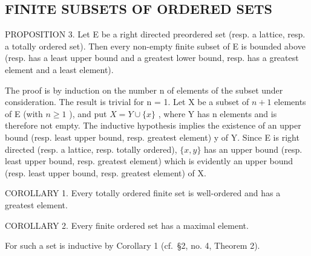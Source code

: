 \subsection{FINITE SUBSETS OF ORDERED SETS}

PROPOSITION 3. Let E be a right directed preordered set (resp. a lattice, resp. a totally ordered set). Then every non-empty finite subset of E is bounded above (resp. has a least upper bound and a greatest lower bound, resp. has a greatest element and a least element).

The proof is by induction on the number n of elements of the subset under consideration. The result is trivial for n = 1. Let X be a subset of \(n + 1\) elements of E (with \(n \geqslant 1\) ), and put \(X = Y \cup \{x\}\) , where Y has n elements and is therefore not empty. The inductive hypothesis implies the existence of an upper bound (resp. least upper bound, resp. greatest element) y of Y. Since E is right directed (resp. a lattice, resp. totally ordered), \(\{x, y\}\) has an upper bound (resp. least upper bound, resp. greatest element) which is evidently an upper bound (resp. least upper bound, resp. greatest element) of X.

COROLLARY 1. Every totally ordered finite set is well-ordered and has a greatest element.

COROLLARY 2. Every finite ordered set has a maximal element.

For such a set is inductive by Corollary 1 (cf.~§2, no. 4, Theorem 2).

